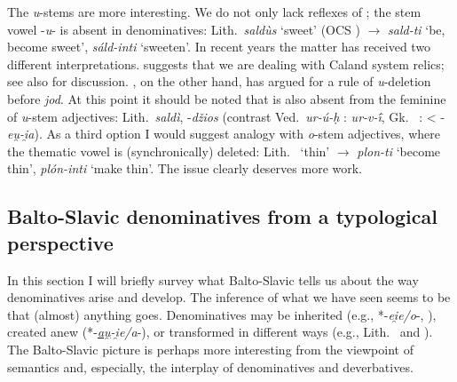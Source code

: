 \documentclass[output=paper,colorlinks,citecolor=brown]{langscibook}
\begin{document}
The \textit{u}-stems are more interesting. We do not only lack reflexes of ; the stem vowel -\textit{u}- is absent in denominatives: Lith.\ \textit{saldùs} ‘sweet’ (OCS ) $\rightarrow$ \textit{sald-ti} ‘be, become sweet’, \textit{sáld-inti} ‘sweeten’. In recent years the matter has received two different interpretations. \citet[117--118]{Ostrowski2006} suggests that we are dealing with Caland system relics;  see also \citet[261--262, and \textit{passim}]{Majer2021} for discussion. \citet[6--13]{Hill2012}, on the other hand, has argued for a  rule of \textit{u}-deletion before \textit{jod}. At this point it should be noted that  is also absent from the feminine of \textit{u}-stem adjectives: Lith.\ \textit{saldì}, -\textit{džios} (contrast Ved.\ \textit{ur-ú-ḥ} : \textit{ur-v-ī́}, Gk.\  :  < -\textit{eu̯-i̯a}). As a third option I would suggest analogy with \textit{o}-stem adjectives, where the thematic vowel is (synchronically) deleted: Lith.\  ‘thin’ $\rightarrow$ \textit{plon-ti} ‘become thin’, \textit{plón-inti} ‘make thin’. The issue clearly deserves more work.

\subsection{Balto-Slavic denominatives from a typological perspective}
\label{sec:BSltypolog}

In this section I will briefly survey what Balto-Slavic tells us about the way denominatives  arise and develop. The inference of what we have seen seems to be that (almost) anything goes. Denominatives may be inherited (e.g., *-\textit{ei̯e/o}-, ), created anew (*-\textit{\underline{au̯}-i̯e/a}-), or transformed in different ways (e.g., Lith.\  and ). The Balto-Slavic picture is perhaps more interesting from the viewpoint of semantics and, especially, the interplay of denominatives and deverbatives.
\end{document}
